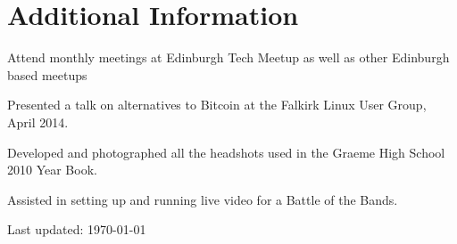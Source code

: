 \documentclass[11pt,a4paper]{article}
\renewenvironment{itemize}{
  \begin{list}{}{
    \setlength{\leftmargin}{1em}
    \setlength{\itemsep}{0.25em}
    \setlength{\parskip}{0pt}
    \setlength{\parsep}{0.25em}
    \renewcommand{\labelitemi}{$\bullet$}
  }
}{
  \end{list}
}
\begin{document}
\section*{Additional Information}

\begin{itemize}
    \item Attend monthly meetings at Edinburgh Tech Meetup as well as other Edinburgh based meetups
    \item Presented a talk on alternatives to Bitcoin at the Falkirk
        Linux User Group, April 2014.
    \item Developed and photographed all the headshots used in the Graeme High
        School 2010 Year Book.
    \item Assisted in setting up and running live video for a Battle of
        the Bands.
\end{itemize}


\medskip
\begin{center}
  \begin{small}
    Last updated: \today
  \end{small}
\end{center}
\end{document}
